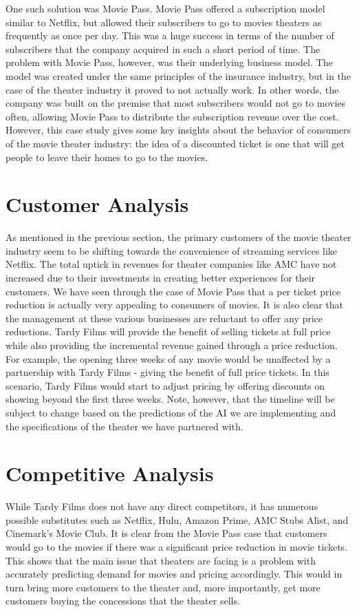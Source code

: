 \documentclass[12pt]{article}
\begin{document}
One such solution was Movie Pass. Movie Pass offered a subscription model similar to Netflix, but allowed their subscribers to go to movies theaters as frequently as once per day. This was a huge success in terms of the number of subscribers that the company acquired in such a short period of time. The problem with Movie Pass, however, was their underlying business model. The model was created under the same principles of the insurance industry, but in the case of the theater industry it proved to not actually work. In other words, the company was built on the premise that most subscribers would not go to movies often, allowing Movie Pass to distribute the subscription revenue over the cost. However, this case study gives some key insights about the behavior of consumers of the movie theater industry: the idea of a discounted ticket is one that will get people to leave their homes to go to the movies.

\section{Customer Analysis}
As mentioned in the previous section, the primary customers of the movie theater industry seem to be shifting towards the convenience of streaming services like Netflix. The total uptick in revenues for theater companies like AMC have not increased due to their investments in creating better experiences for their customers. We have seen through the case of Movie Pass that a per ticket price reduction is actually very appealing to consumers of movies. It is also clear that the management at these various businesses are reluctant to offer any price reductions. Tardy Films will provide the benefit of selling tickets at full price while also providing the incremental revenue gained through a price reduction. For example, the opening three weeks of any movie would be unaffected by a partnership with Tardy Films - giving the benefit of full price tickets. In this scenario, Tardy Films would start to adjust pricing by offering discounts on showing beyond the first three weeks. Note, however, that the timeline will be subject to change based on the predictions of the AI we are implementing and the specifications of the theater we have partnered with.

\section{Competitive Analysis}
While Tardy Films does not have any direct competitors, it has numerous possible substitutes such as Netflix, Hulu, Amazon Prime, AMC Stubs Alist, and Cinemark's Movie Club. It is clear from the Movie Pass case that customers would go to the movies if there was a significant price reduction in movie tickets. This shows that the main issue that theaters are facing is a problem with accurately predicting demand for movies and pricing accordingly. This would in turn bring more customers to the theater and, more importantly, get more customers buying the concessions that the theater sells.
\end{document}

